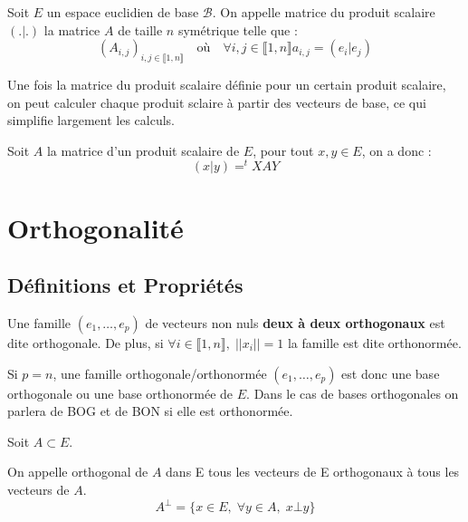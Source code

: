 \begin{definition}
    Soit $E$ un espace euclidien de base $\mathcal{B}$. On appelle matrice du produit scalaire $(.|.)$ la matrice $A$ de taille $n$ symétrique 
    telle que : 
        \[ (A_{i,j})_{i,j \in \llbracket 1, n \rrbracket} \quad \text{où} \quad \forall i,j \in \llbracket 1, n \rrbracket a_{i,j} = (e_i | e_j) \] 

\end{definition}

Une fois la matrice du produit scalaire définie pour un certain produit scalaire, on peut calculer chaque produit 
sclaire à partir des vecteurs de base, ce qui simplifie largement les calculs. 

\begin{proposition}
    Soit $A$ la matrice d'un produit scalaire de $E$, pour tout $x,y \in E$, on a donc :
        \[ (x|y) = ^tXAY \] 
\end{proposition}


\section{Orthogonalité}

\subsection{Définitions et Propriétés}

\begin{definition}
    Une famille $(e_1, \dots, e_p)$ de vecteurs non nuls \textbf{deux à deux orthogonaux} est dite orthogonale. 
    De plus, si $ \forall i \in \llbracket 1, n \rrbracket , \; ||x_i|| = 1 $ la famille est dite orthonormée.
\end{definition}

\begin{remark}
    Si $p = n$, une famille orthogonale/orthonormée $(e_1, \dots, e_p)$ est donc une base orthogonale ou une base orthonormée de $E$.
    Dans le cas de bases orthogonales on parlera de BOG et de BON si elle est orthonormée. 
\end{remark}

\begin{definition}[Orthogonal]
    Soit $A \subset E $.

    On appelle orthogonal de $A$ dans E tous les vecteurs de E orthogonaux à tous les vecteurs de $A$. 
    \[ \boxed { A^{\bot} = \{ x \in E, \; \forall y \in A, \; x \bot y \} } \] 
\end{definition}


